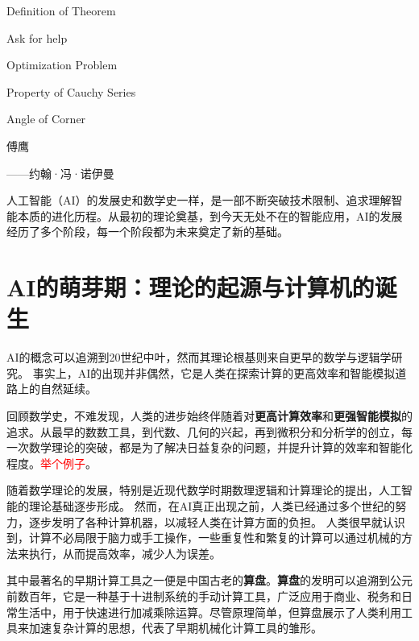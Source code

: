 
 \begin{introduction}
  \item Definition of Theorem
  \item Ask for help
  \item Optimization Problem
  \item Property of Cauchy Series
  \item Angle of Corner
\end{introduction}

\begin{flushright}
                                          傅鹰
\end{flushright}


\begin{flushright}
 ------约翰·冯·诺伊曼
\end{flushright}

人工智能（AI）的发展史和数学史一样，是一部不断突破技术限制、追求理解智能本质的进化历程。从最初的理论奠基，到今天无处不在的智能应用，AI的发展经历了多个阶段，每一个阶段都为未来奠定了新的基础。

\section{AI的萌芽期：理论的起源与计算机的诞生}
AI的概念可以追溯到20世纪中叶，然而其理论根基则来自更早的数学与逻辑学研究。
事实上，AI的出现并非偶然，它是人类在探索计算的更高效率和智能模拟道路上的自然延续。

回顾数学史，不难发现，人类的进步始终伴随着对{\bf 更高计算效率}和{\bf 更强智能模拟}的追求。从最早的数数工具，到代数、几何的兴起，再到微积分和分析学的创立，每一次数学理论的突破，都是为了解决日益复杂的问题，并提升计算的效率和智能化程度。\textcolor{red}{举个例子}。

随着数学理论的发展，特别是近现代数学时期数理逻辑和计算理论的提出，人工智能的理论基础逐步形成。
然而，在AI真正出现之前，人类已经通过多个世纪的努力，逐步发明了各种计算机器，以减轻人类在计算方面的负担。
人类很早就认识到，计算不必局限于脑力或手工操作，一些重复性和繁复的计算可以通过机械的方法来执行，从而提高效率，减少人为误差。

其中最著名的早期计算工具之一便是中国古老的{\bf 算盘}。{\bf 算盘}的发明可以追溯到公元前数百年，它是一种基于十进制系统的手动计算工具，广泛应用于商业、税务和日常生活中，用于快速进行加减乘除运算。尽管原理简单，但算盘展示了人类利用工具来加速复杂计算的思想，代表了早期机械化计算工具的雏形。

